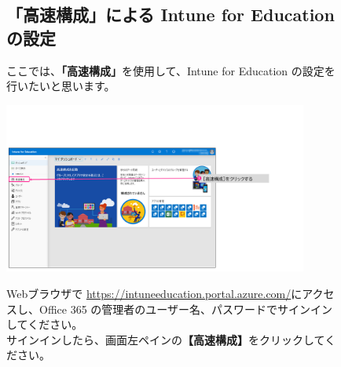 \begin{figure}[]
    \subsection{「高速構成」による Intune for Education の設定}

    \hspace{8pt} ここでは、\textbf{「高速構成」}を使用して、Intune for Education の設定を行いたいと思います。
\end{figure}

\begin{figure}[h]
    \begin{minipage}{0.6\textwidth}
        \vspace{-1cm}
        \includegraphics[width=10cm]{figures/Setup-Intune-01.png}
    \end{minipage}
    \begin{minipage}{0.4\textwidth}
        Webブラウザで \url{https://intuneeducation.portal.azure.com/}にアクセスし、Office 365 の管理者のユーザー名、パスワードでサインインしてください。\\
        サインインしたら、画面左ペインの\textbf{【高速構成】}をクリックしてください。
    \end{minipage}
\end{figure}

